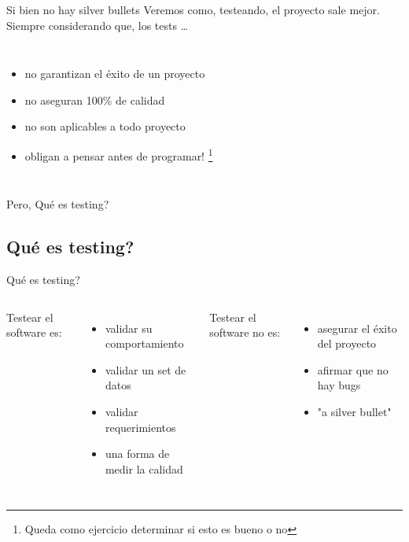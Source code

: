 \begin{frame}{Si bien no hay silver bullets}
Veremos como, testeando, el proyecto sale mejor. \\
\alert{ Siempre considerando que, los tests \ldots }
\bigskip
\begin{columns}[onlytextwidth]
	\begin{itemize}
		\item no garantizan el \'exito de un proyecto
		\item no aseguran 100\% de calidad
		\item no son aplicables a todo proyecto
		\item obligan a pensar antes de programar! \footnote{Queda como ejercicio determinar si esto es bueno o no}
	\end{itemize}
\end{columns}
\bigskip
Pero, \textquestiondown Qu\'e es testing?
\end{frame}


\subsection{\textquestiondown Qu\'e es testing?}

\begin{frame}{\textquestiondown Qu\'e es testing?}
\begin{columns}[onlytextwidth]
	Testear el software es:
	\begin{itemize}
		\item validar su comportamiento
		\item validar un set de datos
		\item validar requerimientos
		\item una forma de medir la calidad
	\end{itemize}
	\bigskip
	Testear el software \alert{no} es:
	\begin{itemize}
		\item asegurar el \'exito del proyecto
		\item afirmar que no hay bugs
		\item "a silver bullet"
	\end{itemize}
\end{columns}
\end{frame}


